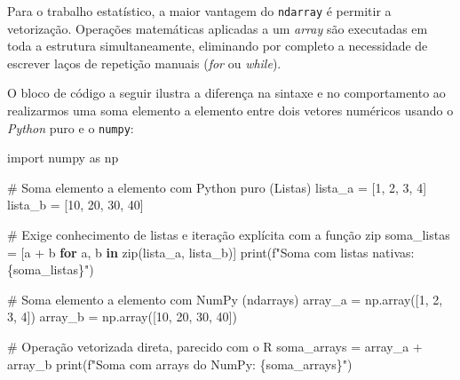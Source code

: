 \documentclass[
  brazilian,
  letterpaper,
  DIV=11,
  numbers=noendperiod]{scrreprt}
\newenvironment{Shaded}{\begin{snugshade}}{\end{snugshade}}
\newcommand{\BuiltInTok}[1]{\textcolor[rgb]{0.00,0.23,0.31}{#1}}
\newcommand{\CommentTok}[1]{\textcolor[rgb]{0.37,0.37,0.37}{#1}}
\newcommand{\ControlFlowTok}[1]{\textcolor[rgb]{0.00,0.23,0.31}{\textbf{#1}}}
\newcommand{\DecValTok}[1]{\textcolor[rgb]{0.68,0.00,0.00}{#1}}
\newcommand{\ImportTok}[1]{\textcolor[rgb]{0.00,0.46,0.62}{#1}}
\newcommand{\KeywordTok}[1]{\textcolor[rgb]{0.00,0.23,0.31}{\textbf{#1}}}
\newcommand{\NormalTok}[1]{\textcolor[rgb]{0.00,0.23,0.31}{#1}}
\newcommand{\OperatorTok}[1]{\textcolor[rgb]{0.37,0.37,0.37}{#1}}
\newcommand{\SpecialCharTok}[1]{\textcolor[rgb]{0.37,0.37,0.37}{#1}}
\newcommand{\SpecialStringTok}[1]{\textcolor[rgb]{0.13,0.47,0.30}{#1}}
\begin{document}
Para o trabalho estatístico, a maior vantagem do \texttt{ndarray} é
permitir a vetorização. Operações matemáticas aplicadas a um
\emph{array} são executadas em toda a estrutura simultaneamente,
eliminando por completo a necessidade de escrever laços de repetição
manuais (\emph{for} ou \emph{while}).

O bloco de código a seguir ilustra a diferença na sintaxe e no
comportamento ao realizarmos uma soma elemento a elemento entre dois
vetores numéricos usando o \emph{Python} puro e o \texttt{numpy}:

\begin{Shaded}
\begin{Highlighting}[]
\ImportTok{import}\NormalTok{ numpy }\ImportTok{as}\NormalTok{ np}

\CommentTok{\# Soma elemento a elemento com Python puro (Listas)}
\NormalTok{lista\_a }\OperatorTok{=}\NormalTok{ [}\DecValTok{1}\NormalTok{, }\DecValTok{2}\NormalTok{, }\DecValTok{3}\NormalTok{, }\DecValTok{4}\NormalTok{]}
\NormalTok{lista\_b }\OperatorTok{=}\NormalTok{ [}\DecValTok{10}\NormalTok{, }\DecValTok{20}\NormalTok{, }\DecValTok{30}\NormalTok{, }\DecValTok{40}\NormalTok{]}

\CommentTok{\# Exige conhecimento de listas e iteração explícita com a função zip}
\NormalTok{soma\_listas }\OperatorTok{=}\NormalTok{ [a }\OperatorTok{+}\NormalTok{ b }\ControlFlowTok{for}\NormalTok{ a, b }\KeywordTok{in} \BuiltInTok{zip}\NormalTok{(lista\_a, lista\_b)]}
\BuiltInTok{print}\NormalTok{(}\SpecialStringTok{f"Soma com listas nativas: }\SpecialCharTok{\{}\NormalTok{soma\_listas}\SpecialCharTok{\}}\SpecialStringTok{"}\NormalTok{)}

\CommentTok{\# Soma elemento a elemento com NumPy (ndarrays)}
\NormalTok{array\_a }\OperatorTok{=}\NormalTok{ np.array([}\DecValTok{1}\NormalTok{, }\DecValTok{2}\NormalTok{, }\DecValTok{3}\NormalTok{, }\DecValTok{4}\NormalTok{])}
\NormalTok{array\_b }\OperatorTok{=}\NormalTok{ np.array([}\DecValTok{10}\NormalTok{, }\DecValTok{20}\NormalTok{, }\DecValTok{30}\NormalTok{, }\DecValTok{40}\NormalTok{])}

\CommentTok{\# Operação vetorizada direta, parecido com o R}
\NormalTok{soma\_arrays }\OperatorTok{=}\NormalTok{ array\_a }\OperatorTok{+}\NormalTok{ array\_b}
\BuiltInTok{print}\NormalTok{(}\SpecialStringTok{f"Soma com arrays do NumPy:  }\SpecialCharTok{\{}\NormalTok{soma\_arrays}\SpecialCharTok{\}}\SpecialStringTok{"}\NormalTok{)}
\end{Highlighting}
\end{Shaded}
\end{document}
